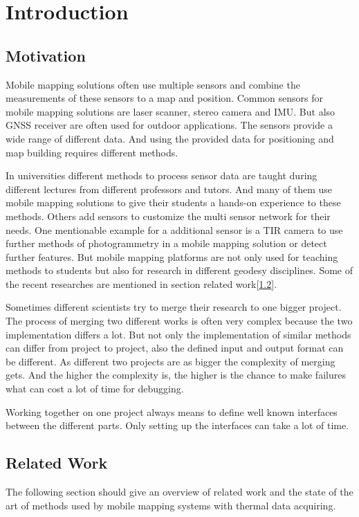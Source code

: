 \chapter{Introduction}\label{ch:introduction}

\section{Motivation}\label{sec:motivation}

Mobile mapping solutions often use multiple sensors and combine the measurements of these sensors to a map and position.
Common sensors for mobile mapping solutions are laser scanner, stereo camera and \ac{IMU}.
But also \ac{GNSS} receiver are often used for outdoor applications.
The sensors provide a wide range of different data.
And using the provided data for positioning and map building requires different methods.

In universities different methods to process sensor data are taught during different lectures from different professors and tutors.
And many of them use mobile mapping solutions to give their students a hands-on experience to these methods.
Others add sensors to customize the multi sensor network for their needs.
One mentionable example for a additional sensor is a \ac{TIR} camera to use further methods of photogrammetry in a mobile mapping solution or detect further features.
But mobile mapping platforms are not only used for teaching methods to students but also for research in different geodesy disciplines.
Some of the recent researches are mentioned in section related work[\ref{sec:related-work}].

Sometimes different scientists try to merge their research to one bigger project.
The process of merging two different works is often very complex because the two implementation differs a lot.
But not only the implementation of similar methods can differ from project to project, also the defined input and output format can be different.
As different two projects are as bigger the complexity of merging gets.
And the higher the complexity is, the higher is the chance to make failures what can cost a lot of time for debugging.

Working together on one project always means to define well known interfaces between the different parts.
Only setting up the interfaces can take a lot of time.

\section{Related Work}\label{sec:related-work}
The following section should give an overview of related work and the state of the art of methods used by mobile mapping systems with thermal data acquiring.

